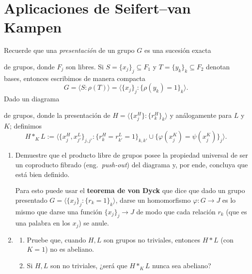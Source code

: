\documentclass[11pt, reqno]{amsart}
\begin{document}
\section{Aplicaciones de Seifert--van Kampen}
Recuerde que una \emph{presentación} de un grupo $G$ es una sucesión exacta 
de grupos, donde $F_j$ son libres.
Si $S = \{ x_j \}_j \subseteq F_1$ y $T = \{ y_k \}_k \subseteq F_2$ denotan bases, entonces escribimos de manera compacta
\[
	G = \langle S : \rho(T) \rangle = \langle \{ x_j \}_j : \{ \rho(y_k) = 1 \}_k \rangle.
\]
Dado un diagrama 
de grupos, donde la presentación de $H = \langle \{ x_j^H \} : \{ r_k^H \}_k \rangle$ y análogamente para $L$ y $K$; definimos
\[
	H *_K L := \langle \{ x_j^H, x_{j'}^L \}_{j,j'} : \{ r_k^H = r_{k'}^L = 1 \}_{k, k'} \cup \{ \varphi(x_j^K) = \psi(x_j^K) \}_j \rangle.
\]
\begin{enumerate}[resume]
	\item Demuestre que el producto libre de grupos posee la propiedad universal de ser un coproducto fibrado (eng.\ \emph{push-out})
		del diagrama y, por ende, concluya que está bien definido.
		\begin{hint}
			Para esto puede usar el \textbf{teorema de von Dyck} que dice que dado un grupo presentado $G = \langle \{ x_j \}_j
			: \{ r_k = 1\}_k \rangle$, darse un homomorfismo $\varphi\colon G \to J$ es lo mismo que darse una función
			$\{ x_j \}_j \to J$ de modo que cada relación $r_k$ (que es una palabra en los $x_j$) se anule.
		\end{hint}

	\item
		\begin{enumerate}
			\item Pruebe que, cuando $H, L$ son grupos no triviales, entonces $H * L$ (con $K = 1$) no es abeliano.
			\item\lookup
				Si $H, L$ son no triviales, ¿será que $H *_K L$ nunca sea abeliano?
		\end{enumerate}
\end{enumerate}
\end{document}
